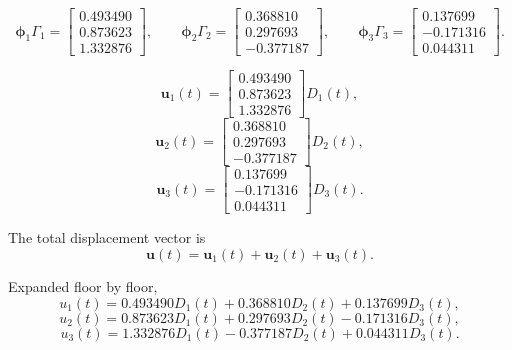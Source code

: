 \documentclass[11pt,a4paper]{article}
\begin{document}
\begin{equation}
\boldsymbol{\phi}_1\Gamma_1=
\begin{bmatrix}
0.493490\\
0.873623\\
1.332876
\end{bmatrix},
\qquad
\boldsymbol{\phi}_2\Gamma_2=
\begin{bmatrix}
0.368810\\
0.297693\\
-0.377187
\end{bmatrix},
\qquad
\boldsymbol{\phi}_3\Gamma_3=
\begin{bmatrix}
0.137699\\
-0.171316\\
0.044311
\end{bmatrix}.
\end{equation}

\begin{equation}
\mathbf{u}_1(t)=
\begin{bmatrix}
0.493490\\
0.873623\\
1.332876
\end{bmatrix}
D_1(t),
\end{equation}
\begin{equation}
\mathbf{u}_2(t)=
\begin{bmatrix}
0.368810\\
0.297693\\
-0.377187
\end{bmatrix}
D_2(t),
\end{equation}
\begin{equation}
\mathbf{u}_3(t)=
\begin{bmatrix}
0.137699\\
-0.171316\\
0.044311
\end{bmatrix}
D_3(t).
\end{equation}

The total displacement vector is
\begin{equation}
\mathbf{u}(t)=\mathbf{u}_1(t)+\mathbf{u}_2(t)+\mathbf{u}_3(t).
\end{equation}

Expanded floor by floor,
\begin{equation}
u_1(t)=0.493490D_1(t)+0.368810D_2(t)+0.137699D_3(t),
\end{equation}
\begin{equation}
u_2(t)=0.873623D_1(t)+0.297693D_2(t)-0.171316D_3(t),
\end{equation}
\begin{equation}
u_3(t)=1.332876D_1(t)-0.377187D_2(t)+0.044311D_3(t).
\end{equation}
\end{document}
